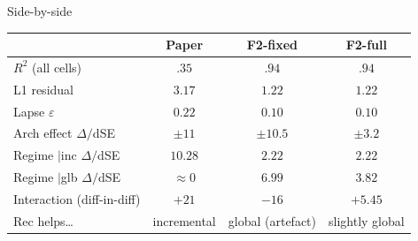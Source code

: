 \documentclass[10pt,aspectratio=169]{beamer}
\newcommand{\hl}[1]{{\color{hlblue}\textbf{#1}}}
\begin{document}
\begin{frame}{Side-by-side}
\small
\begin{center}
\begin{tabular}{lccc}
\toprule
                             & Paper        & F2-fixed & \hl{F2-full} \\
\midrule
$R^2$ (all cells)            & $.35$      & $.94$ & $.94$ \\
L1 residual                  & $3.17$    & $1.22$   & $1.22$ \\
Lapse $\varepsilon$          & $0.22$      & $0.10$ & $0.10$ \\
\midrule
Arch effect $\Delta/$dSE     & $\pm 11$    & $\pm 10.5$ & $\pm 3.2$ \\
Regime $|$inc $\Delta/$dSE   & $10.28$     & $2.22$ & $2.22$ \\
Regime $|$glb $\Delta/$dSE   & $\approx 0$ & $6.99$ & $3.82$ \\
Interaction (diff-in-diff)   & $+21$       & $-16$ & $+5.45$ \\
\midrule
Rec helps\ldots              & incremental & global (artefact) & slightly global \\
\bottomrule
\end{tabular}
\end{center}
\end{frame}
\end{document}
